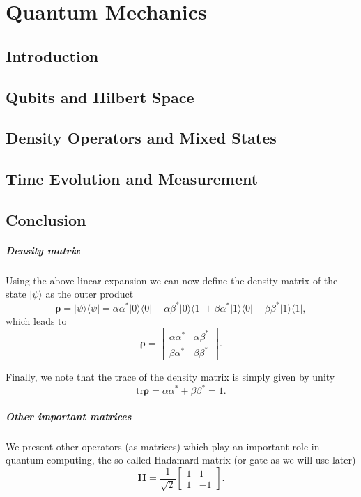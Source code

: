 \chapter{Quantum Mechanics}
\section{Introduction}
\section{Qubits and Hilbert Space}
\section{Density Operators and Mixed States}
\section{Time Evolution and Measurement}
\section{Conclusion}


\paragraph{Density matrix}

Using the above linear expansion we can now define the density matrix of the state $\vert \psi\rangle$ as the outer product
\[
\bm{\rho}=\vert \psi \rangle\langle \psi \vert = \alpha\alpha^* \vert 0 \rangle\langle 0\vert+\alpha\beta^* \vert 0 \rangle\langle 1\vert+\beta\alpha^* \vert 1 \rangle\langle 0\vert+\beta\beta^* \vert 1 \rangle\langle 1\vert,
\]
which leads to
\[
\bm{\rho}=\begin{bmatrix} \alpha\alpha^* & \alpha\beta^*\\ \beta\alpha^* & \beta\beta^*\end{bmatrix}.
\]

Finally, we note that the trace of the density matrix is simply given by unity
\[
\mathrm{tr}\bm{\rho}=\alpha\alpha^* +\beta\beta^*=1.
\]


\paragraph{Other important matrices}

We present other operators (as matrices) which play an important role in quantum computing, the so-called Hadamard matrix (or gate as we will use later)
\[
\bm{H}=\frac{1}{\sqrt{2}}\begin{bmatrix} 1 & 1 \\ 1 & -1\end{bmatrix}.
\]

